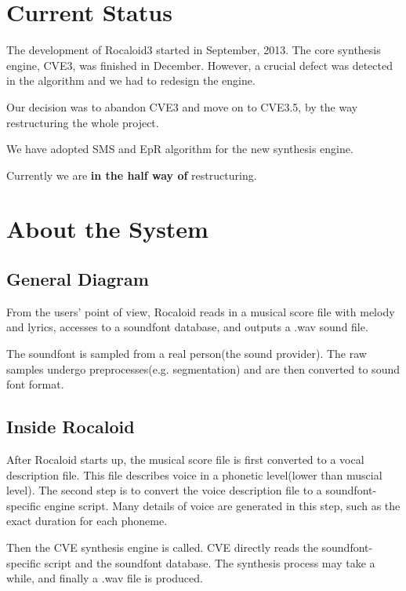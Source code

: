 \section{Current Status}\indent

        The development of Rocaloid3 started in September, 2013. The core synthesis engine, CVE3, was finished in December. However, a crucial defect was detected in the algorithm and we had to redesign the engine.
        
        Our decision was to abandon CVE3 and move on to CVE3.5, by the way restructuring the whole project.
        
        We have adopted SMS and EpR algorithm for the new synthesis engine.
        
        Currently we are \textbf{in the half way of} restructuring.

\section{About the System}

\subsection{General Diagram}\indent

        From the users' point of view, Rocaloid reads in a musical score file with melody and lyrics, accesses to a soundfont database, and outputs a .wav sound file.

        The soundfont is sampled from a real person(the sound provider). The raw samples undergo preprocesses(e.g. segmentation) and are then converted to sound font format.
        
        \newpage

\subsection{Inside Rocaloid}\indent

        After Rocaloid starts up, the musical score file is first converted to a vocal description file. This file describes voice in a phonetic level(lower than muscial level). The second step is to convert the voice description file to a soundfont-specific engine script. Many details of voice are generated in this step, such as the exact duration for each phoneme.
        
        Then the CVE synthesis engine is called. CVE directly reads the soundfont-specific script and the soundfont database. The synthesis process may take a while, and finally a .wav file is produced.
        
